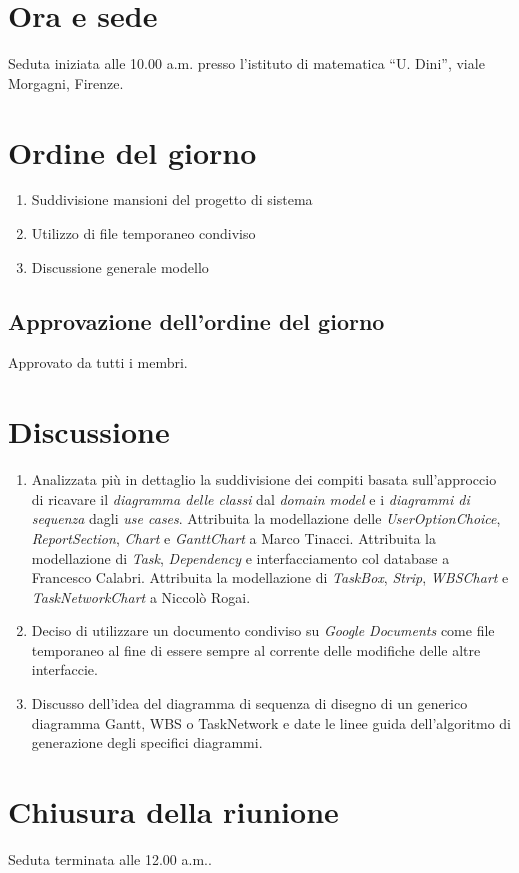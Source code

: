 \section*{Ora e sede}
Seduta iniziata alle 10.00 a.m. presso l'istituto
di matematica ``U. Dini'', viale Morgagni, Firenze.

\section*{Ordine del giorno}
\begin{enumerate}
	\item Suddivisione mansioni del progetto di sistema
	\item Utilizzo di file temporaneo condiviso
	\item Discussione generale modello
\end{enumerate}

\subsection*{Approvazione dell'ordine del giorno}
Approvato da tutti i membri.

\section*{Discussione}
\begin{enumerate}
	\item Analizzata pi\`u in dettaglio la suddivisione dei compiti basata sull'approccio di ricavare il \emph{diagramma delle classi} dal \emph{domain model} e i \emph{diagrammi di sequenza} dagli \emph{use cases}. 
Attribuita la modellazione delle \emph{UserOptionChoice}, \emph{ReportSection}, \emph{Chart} e \emph{GanttChart} a Marco Tinacci.
Attribuita la modellazione di \emph{Task}, \emph{Dependency} e interfacciamento col database a Francesco Calabri. 
Attribuita la modellazione di \emph{TaskBox}, \emph{Strip}, \emph{WBSChart} e \emph{TaskNetworkChart} a Niccol\`o Rogai.
\item Deciso di utilizzare un documento condiviso su \emph{Google Documents} come file temporaneo al fine di essere sempre al corrente delle modifiche delle altre interfaccie.
\item Discusso dell'idea del diagramma di sequenza di disegno di un generico diagramma Gantt, WBS o TaskNetwork e date le linee guida dell'algoritmo di generazione degli specifici diagrammi.
	
\end{enumerate}

\section*{Chiusura della riunione}
Seduta terminata alle 12.00 a.m..
